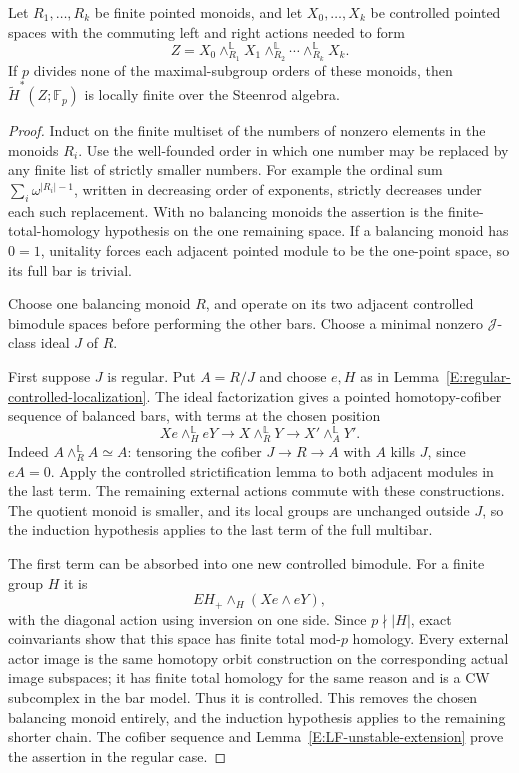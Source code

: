 \begin{theorem}\label{E:general-controlled-multibar}
Let $R_1,\ldots,R_k$ be finite pointed monoids, and let
$X_0,\ldots,X_k$ be controlled pointed spaces with the commuting
left and right actions needed to form
\[
 Z=X_0\mathbin{\wedge_{R_1}^{\mathbb L}}X_1
       \mathbin{\wedge_{R_2}^{\mathbb L}}\cdots
       \mathbin{\wedge_{R_k}^{\mathbb L}}X_k.
\]
If $p$ divides none of the maximal-subgroup orders of these monoids,
then $\widetilde H^*(Z;\mathbb F_p)$ is locally finite over the
Steenrod algebra.
\end{theorem}

\begin{proof}
Induct on the finite multiset of the numbers of nonzero elements in
the monoids $R_i$.  Use the well-founded order in which one number
may be replaced by any finite list of strictly smaller numbers.
For example the ordinal sum $\sum_i\omega^{|R_i|-1}$, written in
decreasing order of exponents, strictly decreases under each such
replacement.  With no balancing monoids the assertion is the
finite-total-homology hypothesis on the one remaining space.
If a balancing monoid has $0=1$, unitality forces each adjacent
pointed module to be the one-point space, so its full bar is trivial.

Choose one balancing monoid $R$, and operate on its two adjacent
controlled bimodule spaces before performing the other bars.  Choose
a minimal nonzero $\mathcal J$-class ideal $J$ of $R$.

First suppose $J$ is regular.  Put $A=R/J$ and choose $e,H$ as in
Lemma~\ref{E:regular-controlled-localization}.  The ideal factorization
gives a pointed homotopy-cofiber sequence of balanced bars, with
terms at the chosen position
\[
 X e\mathbin{\wedge_H^{\mathbb L}}eY
   \longrightarrow X\mathbin{\wedge_R^{\mathbb L}}Y
   \longrightarrow X'\mathbin{\wedge_A^{\mathbb L}}Y'.
\]
Indeed $A\wedge_R^{\mathbb L}A\simeq A$: tensoring the cofiber
$J\to R\to A$ with $A$ kills $J$, since $eA=0$.
Apply the controlled strictification lemma to both adjacent modules
in the last term.  The remaining external actions commute with
these constructions.  The quotient monoid is smaller, and its local
groups are unchanged outside $J$, so the induction hypothesis applies
to the last term of the full multibar.

The first term can be absorbed into one new controlled bimodule.
For a finite group $H$ it is
\[
 EH_+\wedge_H(Xe\wedge eY),
\]
with the diagonal action using inversion on one side.  Since
$p\nmid|H|$, exact coinvariants show that this space has finite total
mod-$p$ homology.  Every external actor image is the same homotopy
orbit construction on the corresponding actual image subspaces;
it has finite total homology for the same reason and is a CW
subcomplex in the bar model.  Thus it is controlled.  This removes
the chosen balancing monoid entirely, and the induction hypothesis
applies to the remaining shorter chain.  The cofiber sequence and
Lemma~\ref{E:LF-unstable-extension} prove the assertion in the regular
case.


\end{proof}
